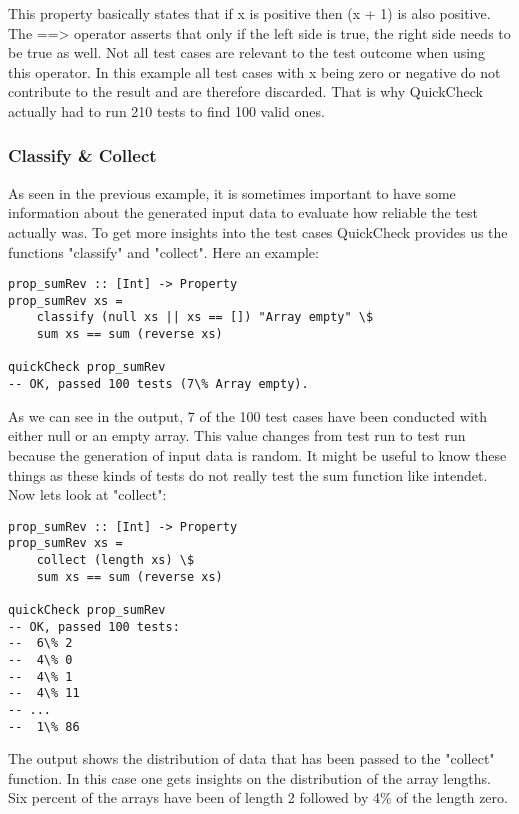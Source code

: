 \documentclass[a4paper, 12pt]{article} %
\begin{document}
This property basically states that if x is positive then (x + 1) is also positive. The ==> operator asserts that only if the left side is true, the right side needs to be true as well. \cite{Claessen2000} Not all test cases are relevant to the test outcome when using this operator. In this example all test cases with x being zero or negative do not contribute to the result and are therefore discarded. That is why QuickCheck actually had to run 210 tests to find 100 valid ones.  

\subsubsection{Classify \& Collect}

As seen in the previous example, it is sometimes important to have some information about the generated input data to evaluate how reliable the test actually was. To get more insights into the test cases QuickCheck provides us the functions "classify" and "collect". \cite{Claessen2000} Here an example:

\begin{verbatim}
prop_sumRev :: [Int] -> Property
prop_sumRev xs = 
    classify (null xs || xs == []) "Array empty" \$
    sum xs == sum (reverse xs)

quickCheck prop_sumRev
-- OK, passed 100 tests (7\% Array empty).
\end{verbatim}

As we can see in the output, 7 of the 100 test cases have been conducted with either null or an empty array. This value changes from test run to test run because the generation of input data is random. It might be useful to know these things as these kinds of tests do not really test the sum function like intendet. Now lets look at "collect":

\begin{verbatim}
prop_sumRev :: [Int] -> Property
prop_sumRev xs = 
    collect (length xs) \$
    sum xs == sum (reverse xs)

quickCheck prop_sumRev
-- OK, passed 100 tests:
--  6\% 2 
--  4\% 0 
--  4\% 1 
--  4\% 11 
-- ... 
--  1\% 86 
\end{verbatim}

The output shows the distribution of data that has been passed to the "collect" function. In this case one gets insights on the distribution of the array lengths. Six percent of the arrays have been of length 2 followed by 4\% of the length zero.
\end{document}

